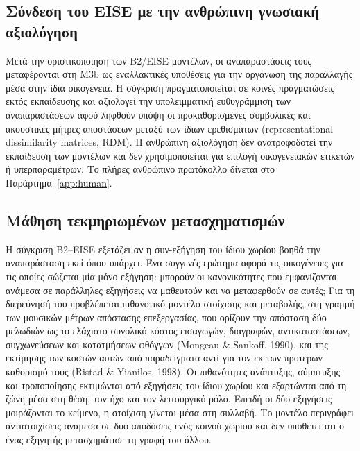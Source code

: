 \documentclass[11pt,a4paper]{article}
\begin{document}
\subsection{Σύνδεση του EISE με την ανθρώπινη γνωσιακή αξιολόγηση}\label{sec:eise-human-link}

Μετά την οριστικοποίηση των B2/EISE μοντέλων, οι αναπαραστάσεις τους μεταφέρονται στη M3b ως εναλλακτικές υποθέσεις για την οργάνωση της παραλλαγής μέσα στην ίδια οικογένεια. Η σύγκριση πραγματοποιείται σε κοινές πραγματώσεις εκτός εκπαίδευσης και αξιολογεί την υπολειμματική ευθυγράμμιση των αναπαραστάσεων αφού ληφθούν υπόψη οι προκαθορισμένες συμβολικές και ακουστικές μήτρες αποστάσεων μεταξύ των ίδιων ερεθισμάτων (representational dissimilarity matrices, RDM). Η ανθρώπινη αξιολόγηση δεν ανατροφοδοτεί την εκπαίδευση των μοντέλων και δεν χρησιμοποιείται για επιλογή οικογενειακών ετικετών ή υπερπαραμέτρων. Το πλήρες ανθρώπινο πρωτόκολλο δίνεται στο Παράρτημα~\ref{app:human}.

\subsection{Μάθηση τεκμηριωμένων μετασχηματισμών}\label{sec:atl}

Η σύγκριση B2--EISE εξετάζει αν η συν-εξήγηση του ίδιου χωρίου βοηθά την αναπαράσταση εκεί όπου υπάρχει. Ένα συγγενές ερώτημα αφορά τις οικογένειες για τις οποίες σώζεται μία μόνο εξήγηση: μπορούν οι κανονικότητες που εμφανίζονται ανάμεσα σε παράλληλες εξηγήσεις να μαθευτούν και να μεταφερθούν σε αυτές; Για τη διερεύνησή του προβλέπεται πιθανοτικό μοντέλο στοίχισης και μεταβολής, στη γραμμή των μουσικών μέτρων απόστασης επεξεργασίας, που ορίζουν την απόσταση δύο μελωδιών ως το ελάχιστο συνολικό κόστος εισαγωγών, διαγραφών, αντικαταστάσεων, συγχωνεύσεων και κατατμήσεων φθόγγων (Mongeau \& Sankoff, 1990), και της εκτίμησης των κοστών αυτών από παραδείγματα αντί για τον εκ των προτέρων καθορισμό τους (Ristad \& Yianilos, 1998). Οι πιθανότητες ανάπτυξης, σύμπτυξης και τροποποίησης εκτιμώνται από εξηγήσεις του ίδιου χωρίου και εξαρτώνται από τη ζώνη μέσα στη θέση, τον ήχο και τον λειτουργικό ρόλο. Επειδή οι δύο εξηγήσεις μοιράζονται το κείμενο, η στοίχιση γίνεται μέσα στη συλλαβή. Το μοντέλο περιγράφει αντιστοιχίσεις ανάμεσα σε δύο αποδόσεις ενός κοινού χωρίου και δεν υποθέτει ότι ο ένας εξηγητής μετασχημάτισε τη γραφή του άλλου.
\end{document}
